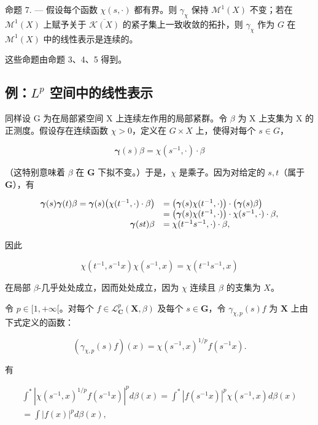命题 7. --- 假设每个函数 \(\chi(s,\cdot)\) 都有界。则 \(\gamma_{\chi}\) 保持 \(\mathcal{M}^{1}(X)\) 不变；若在 \(\mathcal{M}^{1}(X)\) 上赋予关于 \(\overline{\mathcal{K}(X)}\) 的紧子集上一致收敛的拓扑，则 \(\gamma_{\chi}\) 作为 \(G\) 在 \(\mathcal{M}^{1}(X)\) 中的线性表示是连续的。

这些命题由命题 3、4、5 得到。

\subsection{\texorpdfstring{例：\(L^{p}\) 空间中的线性表示}{例：L\^{}\{p\} 空间中的线性表示}}

同样设 G 为在局部紧空间 X 上连续左作用的局部紧群。令 \(\beta\) 为 X 上支集为 X 的正测度。假设存在连续函数 \(\chi > 0\)，定义在 \(G \times X\) 上，使得对每个 \(s \in G\)，

\[
\boldsymbol {\gamma} (s) \beta = \chi (s ^ {- 1}, \cdot) \cdot \beta
\]

（这特别意味着 \(\beta\) 在 \(\mathbf{G}\) 下拟不变。）于是，\(\chi\) 是乘子。因为对给定的 \(s, t\)（属于 \(\mathbf{G}\)），有

\[
\begin{array}{r l} \boldsymbol {\gamma} (s) \boldsymbol {\gamma} (t) \beta = \boldsymbol {\gamma} (s) \big (\chi (t ^ {- 1}, \cdot) \cdot \beta \big) & = \big (\boldsymbol {\gamma} (s) \chi (t ^ {- 1}, \cdot) \big) \cdot \big (\boldsymbol {\gamma} (s) \beta \big) \\ & = \big (\boldsymbol {\gamma} (s) \chi (t ^ {- 1}, \cdot) \big) \cdot \chi (s ^ {- 1}, \cdot) \cdot \beta , \\ \boldsymbol {\gamma} (s t) \beta & = \chi (t ^ {- 1} s ^ {- 1}, \cdot) \cdot \beta , \end{array}
\]

因此

\[
\chi (t ^ {- 1}, s ^ {- 1} x) \chi (s ^ {- 1}, x) = \chi (t ^ {- 1} s ^ {- 1}, x)
\]

在局部 \(\beta\)-几乎处处成立，因而处处成立，因为 \(\chi\) 连续且 \(\beta\) 的支集为 \(X\)。

令 \(p \in [1, +\infty[\)。对每个 \(f \in \mathcal{L}_{\mathbf{C}}^{p}(\mathbf{X}, \beta)\) 及每个 \(s \in \mathbf{G}\)，令 \(\gamma_{\chi,p}(s)f\) 为 \(\mathbf{X}\) 上由下式定义的函数：

\[
\left(\gamma_ {\chi , p} (s) f\right) (x) = \chi (s ^ {- 1}, x) ^ {1 / p} f (s ^ {- 1} x).
\]

有

\[
\begin{array}{c} \int^ {*} | \chi (s ^ {- 1}, x) ^ {1 / p} f (s ^ {- 1} x) | ^ {p} d \beta (x) = \int^ {*} | f (s ^ {- 1} x) | ^ {p} \chi (s ^ {- 1}, x) d \beta (x) \\ = \int | f (x) | ^ {p} d \beta (x), \end{array}
\]

